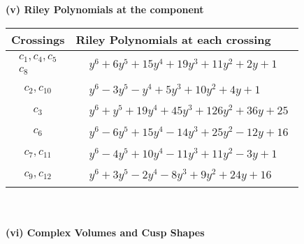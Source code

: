 \documentclass[1p]{elsarticle_modified}
\theoremstyle{definition}
\begin{document}
\newpage\renewcommand{\arraystretch}{1}
\flushleft \textbf{(v) Riley Polynomials at the component}\newline \\
\begin{tabular}{m{50pt}|m{274pt}}
Crossings & \hspace{64pt}Riley Polynomials at each crossing \\
\hline $$\begin{aligned}c_{1},c_{4},c_{5}\\c_{8}\end{aligned}$$&$\begin{aligned}
&y^6+6 y^5+15 y^4+19 y^3+11 y^2+2 y+1
\end{aligned}$\\
\hline $$\begin{aligned}c_{2},c_{10}\end{aligned}$$&$\begin{aligned}
&y^6-3 y^5- y^4+5 y^3+10 y^2+4 y+1
\end{aligned}$\\
\hline $$\begin{aligned}c_{3}\end{aligned}$$&$\begin{aligned}
&y^6+y^5+19 y^4+45 y^3+126 y^2+36 y+25
\end{aligned}$\\
\hline $$\begin{aligned}c_{6}\end{aligned}$$&$\begin{aligned}
&y^6-6 y^5+15 y^4-14 y^3+25 y^2-12 y+16
\end{aligned}$\\
\hline $$\begin{aligned}c_{7},c_{11}\end{aligned}$$&$\begin{aligned}
&y^6-4 y^5+10 y^4-11 y^3+11 y^2-3 y+1
\end{aligned}$\\
\hline $$\begin{aligned}c_{9},c_{12}\end{aligned}$$&$\begin{aligned}
&y^6+3 y^5-2 y^4-8 y^3+9 y^2+24 y+16
\end{aligned}$\\
\hline
\end{tabular}\\~\\
\newpage\flushleft \textbf{(vi) Complex Volumes and Cusp Shapes}
\end{document}
